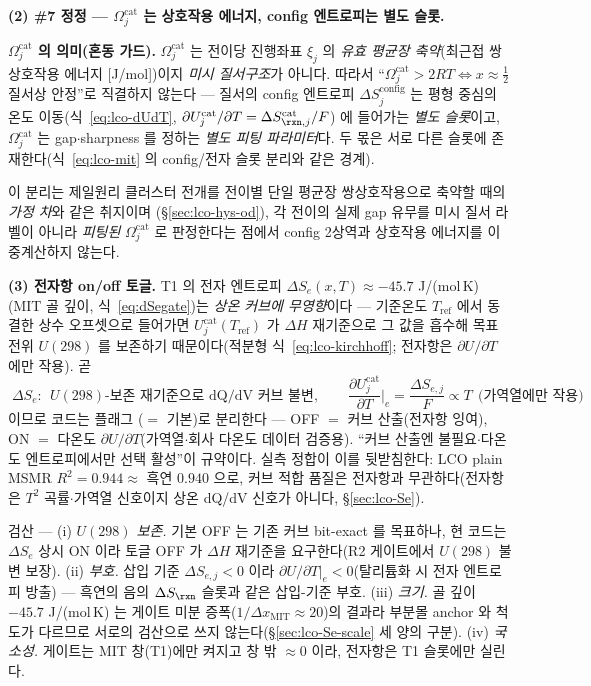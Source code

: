 \textbf{(2) \#7 정정 --- $\Omega_j^\mathrm{cat}$ 는 상호작용 에너지, config 엔트로피는 별도 슬롯.}
\begin{keybox}
\textbf{$\Omega_j^\mathrm{cat}$ 의 의미(혼동 가드).} $\Omega_j^\mathrm{cat}$ 는 전이당 진행좌표 $\xi_j$ 의 \emph{유효
평균장 축약}(최근접 쌍 상호작용 에너지 [J/mol])이지 \emph{미시 질서구조}가 아니다. 따라서 ``$\Omega_j^\mathrm{cat}>2RT
\Leftrightarrow x{\approx}\tfrac12$ 질서상 안정''로 직결하지 않는다 --- 질서의 config 엔트로피 $\Delta S_j^\mathrm{config}$
는 평형 중심의 온도 이동(식~\eqref{eq:lco-dUdT}, $\partial U_j^\mathrm{cat}/\partial T=\Delta S_{\rxn,j}^\mathrm{cat}/F$)
에 들어가는 \emph{별도 슬롯}이고, $\Omega_j^\mathrm{cat}$ 는 gap$\cdot$sharpness 를 정하는 \emph{별도 피팅 파라미터}다.
두 몫은 서로 다른 슬롯에 존재한다(식~\eqref{eq:lco-mit} 의 config/전자 슬롯 분리와 같은 경계).
\end{keybox}
이 분리는 제일원리 클러스터 전개를 전이별 단일 평균장 쌍상호작용으로 축약할 때의 \emph{가정 차}와 같은 취지이며
(\S\ref{sec:lco-hys-od}), 각 전이의 실제 gap 유무를 미시 질서 라벨이 아니라 \emph{피팅된} $\Omega_j^\mathrm{cat}$ 로
판정한다는 점에서 config 2상역과 상호작용 에너지를 이중계산하지 않는다.

\textbf{(3) 전자항 on/off 토글.} T1 의 전자 엔트로피 $\Delta S_e(x,T)\approx-45.7$ J/(mol\,K)(MIT 골 깊이,
식~\eqref{eq:dSegate})는 \emph{상온 커브에 무영향}이다 --- 기준온도 $T_\mathrm{ref}$ 에서 동결한 상수 오프셋으로
들어가면 $U_j^\mathrm{cat}(T_\mathrm{ref})$ 가 $\Delta H$ 재기준으로 그 값을 흡수해 목표 전위 $U(298)$ 를 보존하기
때문이다(적분형 식~\eqref{eq:lco-kirchhoff}; 전자항은 $\partial U/\partial T$ 에만 작용). 곧
\begin{equation}
\boxed{\;\Delta S_e:\ \ U(298)\text{-보존 재기준으로 dQ/dV 커브 불변},\qquad
\frac{\partial U_j^\mathrm{cat}}{\partial T}\Big|_e=\frac{\Delta S_{e,j}}{F}\propto T\ \ \text{(가역열에만 작용)}\;}
\label{eq:lco-etoggle}
\end{equation}
이므로 코드는 플래그 ($=$ 기본)로 분리한다 --- OFF $=$ 커브 산출(전자항
잉여), ON $=$ 다온도 $\partial U/\partial T$(가역열$\cdot$회사 다온도 데이터 검증용). ``커브 산출엔 불필요$\cdot$다온도
엔트로피에서만 선택 활성''이 규약이다. 실측 정합이 이를 뒷받침한다: LCO plain MSMR $R^2{=}0.944\approx$ 흑연 $0.940$
으로, 커브 적합 품질은 전자항과 무관하다(전자항은 $T^2$ 곡률$\cdot$가역열 신호이지 상온 dQ/dV 신호가 아니다,
\S\ref{sec:lco-Se})\cite{motohashi2009}.
\begin{verifybox}
검산 --- (i) \emph{$U(298)$ 보존.} 기본 OFF 는 기존 커브 bit-exact 를 목표하나, 현 코드는 $\Delta S_e$ 상시 ON 이라
토글 OFF 가 $\Delta H$ 재기준을 요구한다(R2 게이트에서 $U(298)$ 불변 보장). (ii) \emph{부호.} 삽입 기준
$\Delta S_{e,j}<0$ 이라 $\partial U/\partial T|_e<0$(탈리튬화 시 전자 엔트로피 방출) --- 흑연의 음의 $\Delta S_\rxn$
슬롯과 같은 삽입-기준 부호. (iii) \emph{크기.} 골 깊이 $-45.7$ J/(mol\,K) 는 게이트 미분 증폭($1/\Delta x_\mathrm{MIT}
\!\approx\!20$)의 결과라 부분몰 anchor 와 척도가 다르므로 서로의 검산으로 쓰지 않는다(\S\ref{sec:lco-Se-scale} 세 양의
구분). (iv) \emph{국소성.} 게이트는 MIT 창(T1)에만 켜지고 창 밖 $\approx0$ 이라, 전자항은 T1 슬롯에만 실린다.
\end{verifybox}

